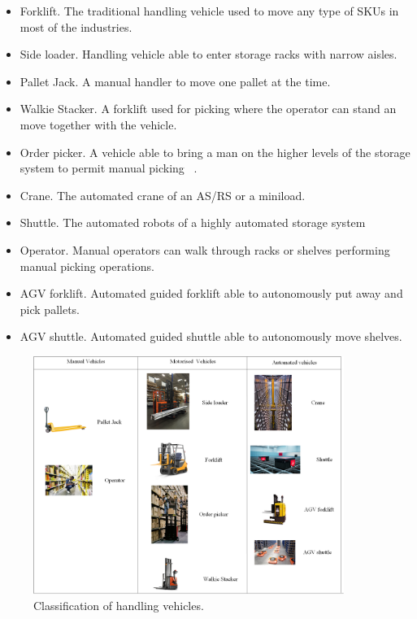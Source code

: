 \begin{itemize}
    \item Forklift. The traditional handling vehicle used to move any type of SKUs in most of the industries.
    \item Side loader. Handling vehicle able to enter storage racks with narrow aisles.
    \item Pallet Jack. A manual handler to move one pallet at the time.
    \item Walkie Stacker. A forklift used for picking where the operator can stand an move together with the vehicle.
    \item Order picker. A vehicle able to bring a man on the higher levels of the storage system to permit manual picking ~\cite{Taylor2007}.
    \item Crane. The automated crane of an AS/RS or a miniload.
    \item Shuttle. The automated robots of a highly automated storage system
    \item Operator. Manual operators can walk through racks or shelves performing manual picking operations.
    \item AGV forklift. Automated guided forklift able to autonomously put away and pick pallets.
    \item AGV shuttle. Automated guided shuttle able to autonomously move shelves.

\end{itemize}


\begin{figure}[hbt!]
\centering
\includegraphics[width=0.9\textwidth]{SectionWarehouses/design_figures/fig_vehicles.png}
\captionsetup{type=figure}
\caption{Classification of handling vehicles.}
\label{fig_vehicles}
\end{figure}

